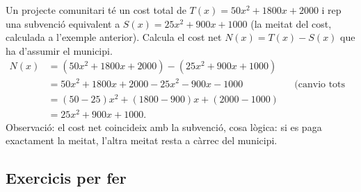 \begin{exresolt}
Un projecte comunitari té un cost total de $T(x) = 50x^2 + \num{1800}x + \num{2000}$
i rep una subvenció equivalent a $S(x) = 25x^2 + 900x + \num{1000}$
(la meitat del cost, calculada a l'exemple anterior). Calcula el cost net
$N(x) = T(x) - S(x)$ que ha d'assumir el municipi.
\solucio
\begin{align*}
N(x) &= (50x^2 + \num{1800}x + \num{2000}) - (25x^2 + 900x + \num{1000}) \\
     &= 50x^2 + \num{1800}x + \num{2000} - 25x^2 - 900x - \num{1000}
       &&\text{(canvio tots els signes)} \\
     &= (50-25)x^2 + (\num{1800}-900)x + (\num{2000}-\num{1000}) \\
     &= 25x^2 + 900x + \num{1000}.
\end{align*}
Observació: el cost net coincideix amb la subvenció, cosa lògica: si es
paga exactament la meitat, l'altra meitat resta a càrrec del municipi.
\end{exresolt}

\subsection{Exercicis per fer}

